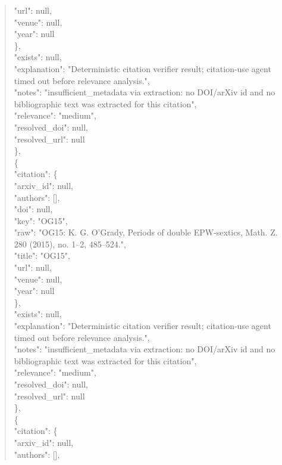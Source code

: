\documentclass[11pt]{article}
\begin{document}
\begin{quote}
        "url": null,\\
        "venue": null,\\
        "year": null\\
      \},\\
      "exists": null,\\
      "explanation": "Deterministic citation verifier result; citation-use agent timed out before relevance analysis.",\\
      "notes": "insufficient\_metadata via extraction: no DOI/arXiv id and no bibliographic text was extracted for this citation",\\
      "relevance": "medium",\\
      "resolved\_doi": null,\\
      "resolved\_url": null\\
    \},\\
    \{\\
      "citation": \{\\
        "arxiv\_id": null,\\
        "authors": [],\\
        "doi": null,\\
        "key": "OG15",\\
        "raw": "OG15: K. G. O'Grady, Periods of double EPW-sextics, Math. Z. 280 (2015), no. 1--2, 485--524.",\\
        "title": "OG15",\\
        "url": null,\\
        "venue": null,\\
        "year": null\\
      \},\\
      "exists": null,\\
      "explanation": "Deterministic citation verifier result; citation-use agent timed out before relevance analysis.",\\
      "notes": "insufficient\_metadata via extraction: no DOI/arXiv id and no bibliographic text was extracted for this citation",\\
      "relevance": "medium",\\
      "resolved\_doi": null,\\
      "resolved\_url": null\\
    \},\\
    \{\\
      "citation": \{\\
        "arxiv\_id": null,\\
        "authors": [],\\

\end{quote}
\end{document}
